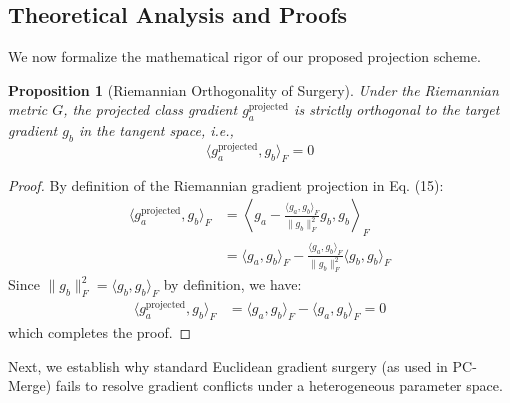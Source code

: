 \documentclass{article}
\theoremstyle{plain}
\newtheorem{proposition}[theorem]{Proposition}
\theoremstyle{definition}
\theoremstyle{remark}
\begin{document}
\subsection{Theoretical Analysis and Proofs}

We now formalize the mathematical rigor of our proposed projection scheme.

\begin{proposition}[Riemannian Orthogonality of Surgery]
Under the Riemannian metric $G$, the projected class gradient $g_a^{\text{projected}}$ is strictly orthogonal to the target gradient $g_b$ in the tangent space, i.e.,
\begin{equation}
    \langle g_a^{\text{projected}}, g_b \rangle_F = 0
\end{equation}
\end{proposition}
\begin{proof}
By definition of the Riemannian gradient projection in Eq. (15):
\begin{align*}
    \langle g_a^{\text{projected}}, g_b \rangle_F &= \left\langle g_a - \frac{\langle g_a, g_b \rangle_F}{\|g_b\|_F^2} g_b, g_b \right\rangle_F \\
    &= \langle g_a, g_b \rangle_F - \frac{\langle g_a, g_b \rangle_F}{\|g_b\|_F^2} \langle g_b, g_b \rangle_F
\end{align*}
Since $\|g_b\|_F^2 = \langle g_b, g_b \rangle_F$ by definition, we have:
\begin{align*}
    \langle g_a^{\text{projected}}, g_b \rangle_F &= \langle g_a, g_b \rangle_F - \langle g_a, g_b \rangle_F = 0
\end{align*}
which completes the proof.
\end{proof}

Next, we establish why standard Euclidean gradient surgery (as used in PC-Merge) fails to resolve gradient conflicts under a heterogeneous parameter space.
\end{document}

